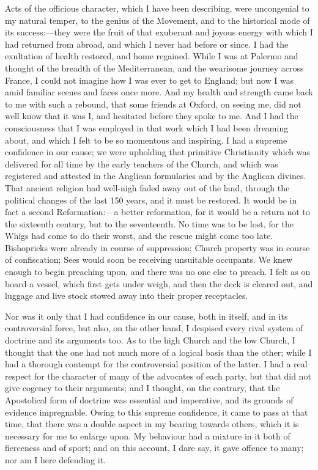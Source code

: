 Acts of the officious character, which I have been describing, were
uncongenial to my natural temper, to the genius of the Movement, and to
the historical mode of its success:—they were the fruit of that
exuberant and joyous energy with which I had returned from abroad, and
which I never had before or since. I had the exultation of health
restored, and home regained. While I was at Palermo and thought of the
breadth of the Mediterranean, and the wearisome journey across France, I
could not imagine how I was ever to get to England; but now I was amid
familiar scenes and faces once more. And my health and strength came
back to me with such a rebound, that some friends at Oxford, on seeing
me, did not well know that it was I, and hesitated before they spoke to
me. And I had the consciousness that I was employed in that work which I
had been dreaming about, and which I felt to be so momentous and
inspiring. I had a supreme confidence in our cause; we were upholding
that primitive Christianity which was delivered for all time by the
early teachers of the Church, and which was registered and attested in
the Anglican formularies and by the Anglican divines. That ancient
religion had well-nigh faded away out of the land, through the political
changes of the last 150 years, and it must be restored. It would be in
fact a second Reformation:—a better reformation, for it would be a
return not to the sixteenth century, but to the seventeenth. No time was
to be lost, for the Whigs had come to do their worst, and the rescue
might come too late. Bishopricks were already in course of suppression;
Church property was in course of confiscation; Sees would soon be
receiving unsuitable occupants. We knew enough to begin preaching upon,
and there was no one else to preach. I felt as on board a
vessel, which first gets under weigh, and then the deck is cleared out, and luggage and live stock
stowed away into their proper receptacles.

Nor was it only that I had confidence in our cause, both in itself,
and in its controversial force, but also, on the other hand, I despised every
rival system of doctrine and its arguments too. As to the high
Church and the low Church, I thought that the one had not much more of a
logical basis than the other; while I had a thorough contempt for the
controversial position of the latter. I had a real respect for the character of many of
the advocates of each party, but that did not give cogency to their
arguments; and I thought, on the contrary, that the
Apostolical form of doctrine was essential and imperative, and its
grounds of evidence impregnable. Owing to this supreme
confidence, it came to pass at that time, that there was a double aspect
in my bearing towards others, which it is necessary for me to enlarge
upon. My behaviour had a mixture in it both of fierceness and of sport;
and on this account, I dare say, it gave offence to many; nor am I here
defending it.

